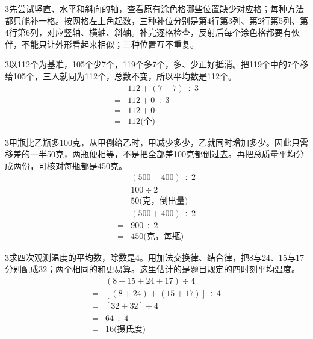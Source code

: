 \documentclass[multi=snippet,border={5bp 20bp 5bp 5bp}]{standalone}
\newenvironment{snippet}[3]{\begin{minipage}{#1bp}\color{answerred}\fontsize{#2}{#3}\selectfont\raggedright}{\end{minipage}}
\begin{document}
\begin{snippet}{505}{11.5}{14}\begin{multicols}{3}\raggedcolumns 先尝试竖直、水平和斜向的轴，查看原有涂色格哪些位置缺少对应格；每种方法都只能补一格。按网格左上角起数，三种补位分别是第4行第3列、第2行第5列、第4行第6列，对应竖轴、横轴、斜轴。补完逐格检查，反射后每个涂色格都要有伙伴，不能只让外形看起来相似；三种位置互不重复。\end{multicols}\end{snippet}
\begin{snippet}{505}{11.5}{14}\begin{multicols}{3}\raggedcolumns 以112个为基准，105个少7个，119个多7个，多、少正好抵消。把119个中的7个移给105个，三人就同为112个，总数不变，所以平均数是112个。\[\begin{aligned}&112+(7-7)\div3\\={}&112+0\div3\\={}&112+0\\={}&112\text{(个)}\end{aligned}\]\end{multicols}\end{snippet}
\begin{snippet}{505}{11.5}{14}\begin{multicols}{3}\raggedcolumns 甲瓶比乙瓶多100克，从甲倒给乙时，甲减少多少，乙就同时增加多少。因此只需移差的一半50克，两瓶便相等，不是把全部差100克都倒过去。再把总质量平均分成两份，可核对每瓶都是450克。\[\begin{aligned}&(500-400)\div2\\={}&100\div2\\={}&50\text{(克，倒出量)}\end{aligned}\]\[\begin{aligned}&(500+400)\div2\\={}&900\div2\\={}&450\text{(克，每瓶)}\end{aligned}\]\end{multicols}\end{snippet}
\begin{snippet}{505}{11.5}{14}\begin{multicols}{3}\raggedcolumns 求四次观测温度的平均数，除数是4。用加法交换律、结合律，把8与24、15与17分别配成32；两个相同的和更易算。这里估计的是题目规定的四时刻平均温度。\[\begin{aligned}&(8+15+24+17)\div4\\={}&[(8+24)+(15+17)]\div4\\={}&[32+32]\div4\\={}&64\div4\\={}&16\text{(摄氏度)}\end{aligned}\]\end{multicols}\end{snippet}
\end{document}
